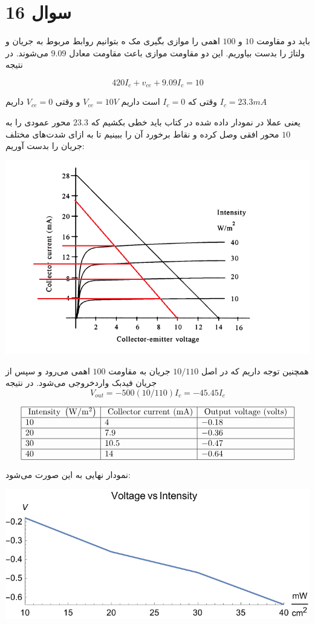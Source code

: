 \documentclass[12pt]{article}
\begin{document}
\section*{سوال 16}



باید دو مقاومت $10$ و $100$ اهمی را موازی بگیری مک ه بتوانیم روابط مربوط به جریان و ولتاژ را بدست بیاوریم. این دو مقاومت موازی باعث مقاومت معادل $9.09$ می‌شوند. در نتیجه

$$420 I_c + v_{ce} + 9.09 I_c = 10$$

وقتی که $I_c=0$ است داریم
 $V_{ce} =10V$ و وقتی
$V_{ce} = 0$
داریم $I_c = 23.3mA$

یعنی عملا در نمودار داده شده در کتاب باید خطی بکشیم که $23.3$ محور عمودی را به $10$ محور افقی وصل کرده و نقاط برخورد آن را ببینیم تا به ازای شدت‌های مختلف جریان را بدست آوریم:


\begin{center}
	\includegraphics[width = 0.5 \textwidth]{images/16.png}
\end{center}

همچنین توجه داریم که در اصل $10/110$ جریان به مقاومت $100$ اهمی می‌رود و سپس از جریان فیدبک واردخروجی می‌شود. در نتیجه
$$V_{out} = -500 (10/110) I_c = -45.45 I_c$$


 $$
 \begin{array}{|l|l|l|}
 	\hline \text { Intensity }\left(\mathrm{W} / \mathrm{m}^{2}\right) & \text { Collector current }(\mathrm{mA}) & \text { Output voltage (volts) } \\
 	\hline 10 & 4 & -0.18 \\
 	\hline 20 & 7.9 & -0.36 \\
 	\hline 30 & 10.5 & -0.47 \\
 	\hline 40 & 14 & -0.64 \\
 	\hline
 \end{array}
 $$
 
 
 نمودار نهایی به این صورت می‌شود:
 
 
 \begin{center}
 	\includegraphics[width = 0.5 \textwidth]{images/16.pdf}
 \end{center}
 
\end{document}
